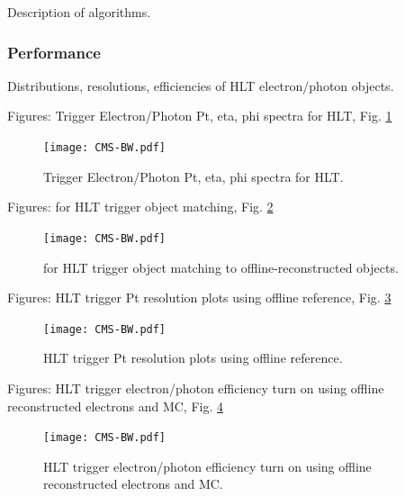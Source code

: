 Description of algorithms.

\subsubsection{Performance}
Distributions, resolutions, efficiencies of HLT electron/photon objects.


Figures: Trigger Electron/Photon Pt, eta, phi spectra for HLT, Fig. \ref{fig:HLTriggerObjectSpectra}

 \begin{figure}[htb]
  \begin{center}
    \texttt{[image: CMS-BW.pdf]}
  \end{center}
  \caption[Trigger Electron/Photon Pt, eta, phi spectra for HLT]{Trigger Electron/Photon Pt, eta, phi spectra for HLT.}
  \label{fig:HLTriggerObjectSpectra}
 \end{figure}


Figures: \DR for HLT trigger object matching, Fig. \ref{fig:HLTriggerObjectDeltaR}

 \begin{figure}[htb]
  \begin{center}
    \texttt{[image: CMS-BW.pdf]}
  \end{center}
  \caption[\DR for HLT trigger object matching to offline]{\DR for HLT trigger object matching to offline-reconstructed objects.}
  \label{fig:HLTriggerObjectDeltaR}
 \end{figure}

Figures: HLT trigger Pt resolution plots using offline reference, Fig. \ref{fig:HLTriggerObjectResolutions}

 \begin{figure}[htb]
  \begin{center}
    \texttt{[image: CMS-BW.pdf]}
  \end{center}
  \caption[HLT trigger Pt resolution plots using offline reference]{HLT trigger Pt resolution plots using offline reference.}
  \label{fig:HLTriggerObjectResolutions}
 \end{figure}

Figures: HLT trigger electron/photon efficiency turn on using offline reconstructed electrons and MC, Fig. \ref{fig:HLTriggerObjectEfficiencies}

 \begin{figure}[htb]
  \begin{center}
    \texttt{[image: CMS-BW.pdf]}
  \end{center}
  \caption[HLT trigger electron/photon efficiency turn on using offline reconstructed electrons and MC]{HLT trigger electron/photon efficiency turn on using offline reconstructed electrons and MC.}
  \label{fig:HLTriggerObjectEfficiencies}
 \end{figure}


